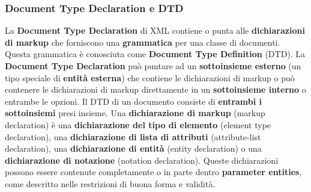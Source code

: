 \documentclass[12pt]{article}
\begin{document}
\subsubsection{Document Type Declaration e DTD}
La \textbf{Document Type Declaration} di XML contiene o punta alle \textbf{dichiarazioni di markup} che forniscono una \textbf{grammatica} per una classe di documenti.
Questa grammatica è conosciuta come \textbf{Document Type Definition} (DTD). La \textbf{Document Type Declaration} può puntare ad un \textbf{sottoinsieme esterno} (un tipo speciale di \textbf{entità esterna}) che contiene le dichiarazioni di markup
o può contenere le dichiarazioni di markup direttamente in un \textbf{sottoinsieme interno} o entrambe le opzioni. Il DTD di un documento consiste di \textbf{entrambi i sottoinsiemi} presi insieme. \newline
Una \textbf{dichiarazione di markup} (markup declaration) è una \textbf{dichiarazione del tipo di elemento} (element type declaration), una \textbf{dichiarazione di lista di attributi} (attribute-list declaration), una \textbf{dichiarazione di entità} (entity declaration) o una
\textbf{dichiarazione di notazione} (notation declaration). Queste dichiarazioni possono essere contenute completamente o in parte dentro \textbf{parameter entities}, come descritto nelle restrizioni di buona forma e validità.
\end{document}
